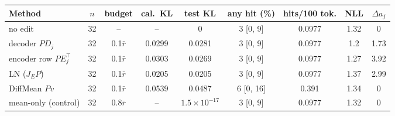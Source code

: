 \begin{tabular}{lcccccccc}
\toprule
Method & $n$ & budget & cal.\ KL & test KL & any hit (\%) & hits/100 tok. & NLL & $\Delta a_j$ \\
\midrule
no edit & 32 & -- & -- & 0 & 3 [0, 9] & 0.0977 & 1.32 & 0 \\
decoder $PD_j$ & 32 & 0.1$\bar r$ & 0.0299 & 0.0281 & 3 [0, 9] & 0.0977 & 1.2 & 1.73 \\
encoder row $PE_j^{\top}$ & 32 & 0.1$\bar r$ & 0.0303 & 0.0269 & 3 [0, 9] & 0.0977 & 1.27 & 3.92 \\
LN ($J_EP$) & 32 & 0.1$\bar r$ & 0.0205 & 0.0205 & 3 [0, 9] & 0.0977 & 1.37 & 2.99 \\
DiffMean $Pv$ & 32 & 0.1$\bar r$ & 0.0539 & 0.0487 & 6 [0, 16] & 0.391 & 1.34 & 0 \\
mean-only (control) & 32 & 0.8$\bar r$ & -- & $1.5\times10^{-17}$ & 3 [0, 9] & 0.0977 & 1.32 & 0 \\
\bottomrule
\end{tabular}

